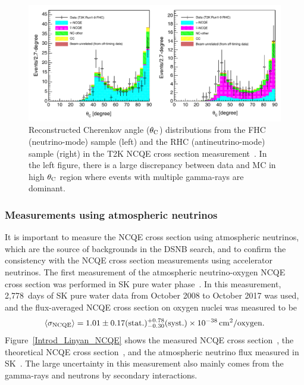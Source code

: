 \begin{figure}[h]
	\centering
	\includegraphics[width=14cm]{Figures/Introduction/T2K_thetaC}
	\caption[Reconstructed Cherenkov angle ($\theta_{\rm C}$) distributions from the FHC (neutrino-mode) sample and the RHC (antineutrino-mode) sample in T2K NCQE cross section measurement]{
	Reconstructed Cherenkov angle ($\theta_{\rm C}$) distributions from the FHC (neutrino-mode) sample (left) and the RHC (antineutrino-mode) sample (right) in the T2K NCQE cross section measurement~\cite{2019Abe}.
	In the left figure, there is a large discrepancy between data and MC in high $\theta_{\rm C}$ region where events with multiple gamma-rays are dominant.
	}\label{Introd_T2K_thetaC}
\end{figure}

\subsubsection{Measurements using atmospheric neutrinos}
\vs\hs
It is important to measure the NCQE cross section using atmospheric neutrinos, which are the source of backgrounds in the DSNB search, and to confirm the consistency with the NCQE cross section measurements using accelerator neutrinos.
The first measurement of the atmospheric neutrino-oxygen NCQE cross section was performed in SK pure water phase~\cite{2019Linyan}.
In this measurement, 2,778~days of SK pure water data from October 2008 to October 2017 was used, and the flux-averaged NCQE cross section on oxygen nuclei was measured to be
\begin{eqnarray}
	\langle \sigma_{\rm NCQE} \rangle = 1.01 \pm 0.17({\rm stat.}) ^{+0.78}_{-0.30}({\rm syst.}) \times 10^{-38}\,{\rm cm}^{2}/{\rm oxygen}.
\end{eqnarray}
Figure~\ref{Introd_Linyan_NCQE} shows the measured NCQE cross section~\cite{2019Linyan}, the theoretical NCQE cross section~\cite{2012Ankowski}, and the atmospheric neutrino flux measured in SK~\cite{2016Richard}.
The large uncertainty in this measurement also mainly comes from the gamma-rays and neutrons by secondary interactions.

